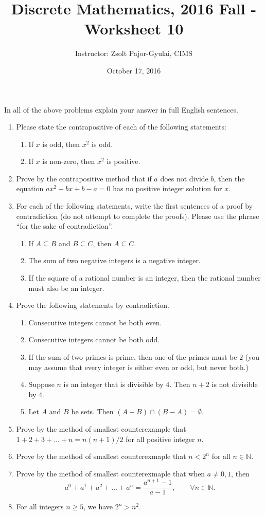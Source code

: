 \documentclass[11pt]{preprint}
\title{Discrete Mathematics, 2016 Fall - Worksheet 10}
\date{October 17, 2016}
\author{Instructor: Zsolt Pajor-Gyulai, CIMS}
\def\enumb{\begin{enumerate}}
\def\enume{\end{enumerate}}
\begin{document}
\maketitle

In all of the above problems explain your answer in full English sentences.

\enumb
\item Please state the contrapositive of each of the following statements:
\enumb
\item If $x$ is odd, then $x^2$ is odd.
\item If $x$ is non-zero, then $x^2$ is positive.
\enume

\item  Prove by the contrapositive method that if $a$ does not divide $b$, then the equation $ax^2+bx+b-a=0$ has no positive integer solution for $x$.

\item For each of the following statements, write the first sentences of a proof by contradiction (do not attempt to complete the proofs). Please use the phrase ``for the sake of contradiction''.
\enumb
 \item If $A\subseteq B$ and $B\subseteq C$, then $A\subseteq C$.
 \item The sum of two negative integers is a negative integer.
 \item If the square of a rational number is an integer, then the rational number must also be an integer.
\enume

\item Prove the following statements by contradiction.
\enumb
\item Consecutive integers cannot be both even.
\item Consecutive integers cannot be both odd.
\item If the sum of two primes is prime, then one of the primes must be $2$ (you may assume that every integer is either even or odd, but never both.)
\item Suppose $n$ is an integer that is divisible by $4$. Then $n+2$ is not divisible by $4$.
\item Let $A$ and $B$ be sets. Then $(A-B)\cap (B-A)=\emptyset$.
\enume

\item Prove by the method of smallest counterexample that $1+2+3+\dots+n=n(n+1)/2$ for all positive integer $n$.
\item Prove by the method of smallest counterexmaple that $n<2^n$ for all $n\in \mathbb{N}$.
\item Prove by the method of smallest counterexmaple that when $a\neq 0,1$, then
\[
a^0+a^1+a^2+\dots+a^n=\frac{a^{n+1}-1}{a-1},\qquad\forall n\in\mathbb{N}.
\]
 \item For all integers $n\geq 5$, we have $2^n>n^2$.
\enume
\end{document}
